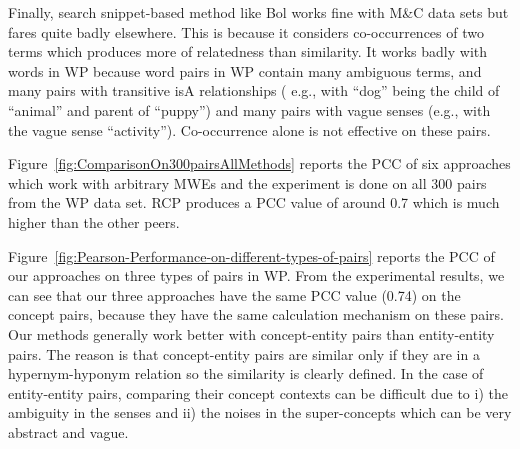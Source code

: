 Finally, search snippet-based method like Bol works fine with M\&C data sets but fares quite badly elsewhere. This is because it considers
co-occurrences of two terms which produces more of relatedness than similarity.  It works badly with words in WP because word pairs in WP
contain many ambiguous terms, and many pairs with transitive isA relationships ( e.g.,  with ``dog'' being the child of
``animal'' and parent of ``puppy'') and many pairs with vague senses (e.g.,  with the vague sense ``activity'').
Co-occurrence alone is not effective on these pairs.

Figure~\ref{fig:ComparisonOn300pairsAllMethods} reports
the PCC of six approaches which work with arbitrary MWEs and the
experiment is done on all 300 pairs from the WP data set.
RCP produces a PCC value of around 0.7 which is much higher
than the other peers.

Figure~\ref{fig:Pearson-Performance-on-different-types-of-pairs} reports the PCC of our approaches on three types of pairs in WP. From the
experimental results, we can see that our three approaches have the same PCC value (0.74) on the concept pairs, because they have the same
calculation mechanism on these pairs. Our methods generally work better with concept-entity pairs than entity-entity pairs. The reason is that
concept-entity pairs are similar only if they are in a hypernym-hyponym relation so the similarity is clearly defined. In the case of
entity-entity pairs, comparing their concept contexts can be difficult due to i) the ambiguity in the senses and ii) the noises in the
super-concepts
which can be very abstract and vague. %

